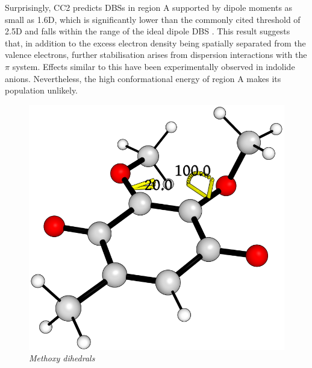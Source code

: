 Surprisingly, CC2 predicts DBSs in region A supported by dipole moments as small as 1.6D, which is significantly lower than the commonly cited threshold of 2.5D and falls within the range of the ideal dipole DBS \cite{jordan2003theory}. This result suggests that, in addition to the excess electron density being spatially separated from the valence electrons, further stabilisation arises from dispersion interactions with the $\pi$ system. Effects similar to this have been experimentally observed in indolide anions\cite{yuan2023observation}. Nevertheless, the high conformational energy of region A makes its population unlikely.

\begin{figure}[h]
  \centering
  \begin{minipage}[b]{0.30\textwidth}
    \centering
    \includegraphics[width=\textwidth]{chapters/results/image/dihedrals.png}
    \small\emph{Methoxy dihedrals}
  \end{minipage}
  \hfill
  \begin{minipage}[b]{0.30\textwidth}
    \centering

\end{minipage}
\end{figure}

